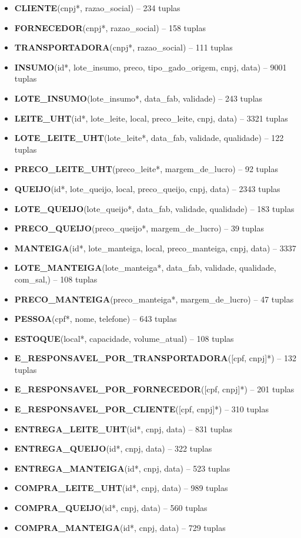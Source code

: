 \documentclass[11pt]{article}
\newcommand{\tbf}[1]{\textbf{#1}}
\begin{document}
\begin{itemize}
	\item \tbf{CLIENTE}(cnpj*, razao\_social) -- 234 tuplas
	\item \tbf{FORNECEDOR}(cnpj*, razao\_social) -- 158 tuplas
	\item \tbf{TRANSPORTADORA}(cnpj*, razao\_social) -- 111 tuplas
	\item \tbf{INSUMO}(id*, lote\_insumo, preco, tipo\_gado\_origem, cnpj, data) 
		-- 9001 tuplas
	\item \tbf{LOTE\_INSUMO}(lote\_insumo*, data\_fab, validade) -- 243 tuplas
	\item \tbf{LEITE\_UHT}(id*, lote\_leite, local, preco\_leite, cnpj, data) 
		-- 3321 tuplas
	\item \tbf{LOTE\_LEITE\_UHT}(lote\_leite*, data\_fab, validade,  qualidade) 
		-- 122 tuplas
	\item \tbf{PRECO\_LEITE\_UHT}(preco\_leite*, margem\_de\_lucro) -- 92 tuplas
	\item \tbf{QUEIJO}(id*, lote\_queijo, local, preco\_queijo, cnpj, data) 
		-- 2343 tuplas
	\item \tbf{LOTE\_QUEIJO}(lote\_queijo*, data\_fab, validade,  qualidade) 
		-- 183 tuplas
	\item \tbf{PRECO\_QUEIJO}(preco\_queijo*, margem\_de\_lucro) 
		-- 39 tuplas
	\item \tbf{MANTEIGA}(id*, lote\_manteiga, local, preco\_manteiga, cnpj, data)
		-- 3337
	\item \tbf{LOTE\_MANTEIGA}(lote\_manteiga*, data\_fab, validade,  qualidade, com\_sal,) -- 108 tuplas
	\item \tbf{PRECO\_MANTEIGA}(preco\_manteiga*, margem\_de\_lucro)
		-- 47 tuplas
	\item \tbf{PESSOA}(cpf*, nome, telefone) -- 643 tuplas
	\item \tbf{ESTOQUE}(local*, capacidade, volume\_atual) -- 108 tuplas
	\item \tbf{E\_RESPONSAVEL\_POR\_TRANSPORTADORA}([cpf, cnpj]*) -- 132 tuplas
	\item \tbf{E\_RESPONSAVEL\_POR\_FORNECEDOR}([cpf, cnpj]*) -- 201 tuplas
	\item \tbf{E\_RESPONSAVEL\_POR\_CLIENTE}([cpf, cnpj]*) -- 310 tuplas
	\item \tbf{ENTREGA\_LEITE\_UHT}(id*, cnpj, data) -- 831 tuplas
	\item \tbf{ENTREGA\_QUEIJO}(id*, cnpj, data) -- 322 tuplas
	\item \tbf{ENTREGA\_MANTEIGA}(id*, cnpj, data) -- 523 tuplas
	\item \tbf{COMPRA\_LEITE\_UHT}(id*, cnpj, data) -- 989 tuplas
	\item \tbf{COMPRA\_QUEIJO}(id*, cnpj, data) -- 560 tuplas
	\item \tbf{COMPRA\_MANTEIGA}(id*, cnpj, data) -- 729 tuplas
\end{itemize}
\end{document}
